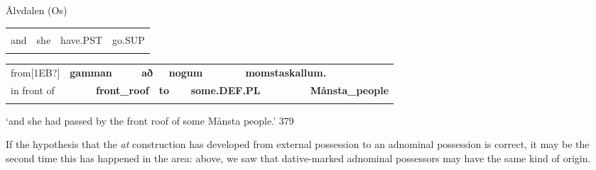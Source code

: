 
\begin{listWWNumileveli}
\item {}

\begin{styleExample}
Älvdalen (Os)

\end{styleExample}

\end{listWWNumileveli}

\begin{tabular}{llll}
\lsptoprule
\multicolumn{4}{l}{Og

}\\
and & she & have.PST & go.SUP\\
\lspbottomrule
\end{tabular}

\begin{tabular}{llllllllll}
\lsptoprule
from[1EB?] & \multicolumn{2}{l}{{\bfseries gamman}

} & \multicolumn{2}{l}{{\bfseries að}

} & \multicolumn{2}{l}{{\bfseries nogum}

} & \multicolumn{2}{l}{{\bfseries momstaskallum.}

} & \\
\multicolumn{2}{l}{in front of 

} & \multicolumn{2}{l}{{\bfseries front\_roof}

} & \multicolumn{2}{l}{{\bfseries to}

} & \multicolumn{2}{l}{{\bfseries some.DEF.PL}

} & \multicolumn{2}{l}{{\bfseries Månsta\_people}

}\\
\lspbottomrule
\end{tabular}

\begin{styleTranslation}
‘and she had passed by the front roof of some Månsta people.’ 379

\end{styleTranslation}

\begin{styleBodyTextFirst}
If the hypothesis that the \textit{at} construction has developed from external possession to an adnominal possession is correct, it may be the second time this has happened in the area: above, we saw that dative-marked adnominal possessors may have the same kind of origin. 

\end{styleBodyTextFirst}

